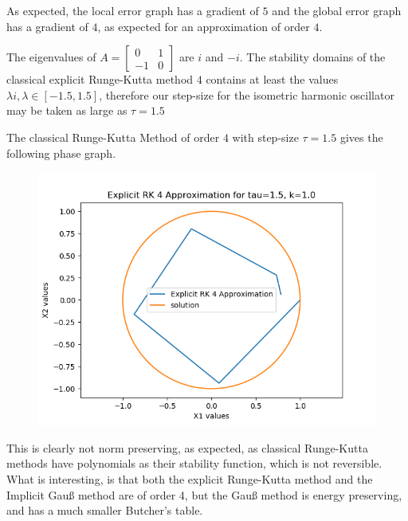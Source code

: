 \documentclass{article}
\theoremstyle{definition}
\begin{document}
\begin{itemize}
		As expected, the local error graph has a gradient of $5$ and the
		global error graph has a gradient of $4$, as expected for an
		approximation of order $4$.

		The eigenvalues of $A=\begin{bmatrix}0 & 1 \\ -1 &
		0\end{bmatrix}$ are $i$ and $-i$. The stability domains of the
		classical explicit Runge-Kutta method $4$
		contains at least the values $\lambda i, \lambda \in [-1.5,
		1.5]$, therefore our step-size for the isometric harmonic
		oscillator may be taken as large as $\tau = 1.5$

		The classical Runge-Kutta Method of order $4$ with
		step-size $\tau = 1.5$ gives the following phase graph.
		\begin{figure}[H]
			\includegraphics[scale=0.6]{harmonic_phase_erk4_15}
		\end{figure}
		This is clearly not norm preserving, as expected, as classical
		Runge-Kutta methods have polynomials as their stability
		function, which is not reversible.  What is interesting, is that
		both the explicit Runge-Kutta
		method and the Implicit Gau{\ss} method are of order 4, but the
		Gau{\ss} method is energy preserving, and has a much smaller
		Butcher's table.
\end{itemize}
\end{document}
